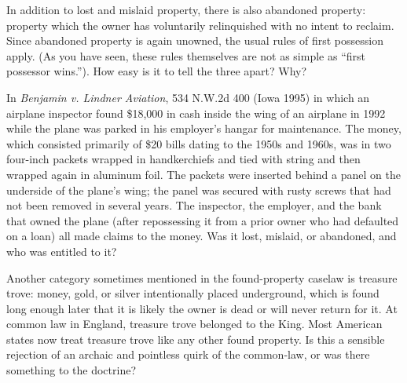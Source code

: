 \item In addition to lost and mislaid property, there is also abandoned
property: property which the owner has voluntarily relinquished with no intent
to reclaim. Since abandoned property is again unowned, the usual rules of first
possession apply. (As you have seen, these rules themselves are not as simple
as ``first possessor wins.''). How easy is it to tell the three apart? Why?


\item In \textit{Benjamin v. Lindner Aviation}, 534 N.W.2d 400 (Iowa
1995)\textbf{} in which an airplane inspector found \$18,000 in cash inside the
wing of an airplane in 1992 while the plane was parked in his employer's hangar
for maintenance. The money, which consisted primarily of \$20 bills dating to
the 1950s and 1960s, was in two four-inch packets wrapped in handkerchiefs and
tied with string and then wrapped again in aluminum foil. The packets were
inserted behind a panel on the underside of the plane's wing; the panel was
secured with rusty screws that had not been removed in several years. The
inspector, the employer, and the bank that owned the plane (after repossessing
it from a prior owner who had defaulted on a loan) all made claims to the
money. Was it lost, mislaid, or abandoned, and who was entitled to it?


\item Another category sometimes mentioned in the found-property caselaw is
treasure trove: money, gold, or silver intentionally placed underground, which
is found long enough later that it is likely the owner is dead or will never
return for it. At common law in England, treasure trove belonged to the King.
Most American states now treat treasure trove like any other found property. Is
this a sensible rejection of an archaic and pointless quirk of the common-law,
or was there something to the doctrine?


